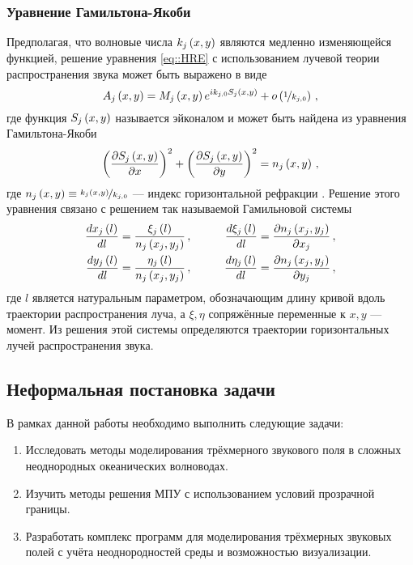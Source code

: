 \documentclass[../document.tex]{subfiles}
\begin{document}
        \subsubsection{Уравнение Гамильтона-Якоби}
            \par Предполагая, что волновые числа $k_j\left(x,y\right)$ являются медленно изменяющейся функцией, решение уравнения \eqref{eq::HRE} с использованием лучевой теории распространения звука может быть выражено в виде
            \begin{equation}
                A_j\left(x,y\right)=M_j\left(x,y\right)e^{ik_{j,0}S_j\left(x,y\right)}+o\left(\nicefrac{1}{k_{j,0}}\right)\,,
            \end{equation}
            где функция $S_j\left(x,y\right)$ называется эйконалом и может быть найдена из уравнения Гамильтона-Якоби
            \begin{equation}\label{eq::hamilton_jacoby}
                \left(\frac{\partial S_j\left(x,y\right)}{\partial x}\right)^2+\left(\frac{\partial S_j\left(x,y\right)}{\partial y}\right)^2=n_j\left(x,y\right)\,,
            \end{equation}
            где $n_j\left(x,y\right)\equiv \nicefrac{k_j\left(x,y\right)}{k_{j,0}}$ --- индекс горизонтальной рефракции \cite{burridge}. Решение этого уравнения связано с решением так называемой Гамильновой системы
            \begin{equation}\label{eq:hamilton_system}
                \begin{aligned}
                    \frac{dx_j\left(l\right)}{dl}&=\frac{\xi_j\left(l\right)}{n_j\left(x_j,y_j\right)}\,,\qquad&\frac{d\xi_j\left(l\right)}{dl}&=\frac{\partial n_j\left(x_j,y_j\right)}{\partial x_j}\,,\\
                    \frac{dy_j\left(l\right)}{dl}&=\frac{\eta_j\left(l\right)}{n_j\left(x_j,y_j\right)}\,,\qquad&\frac{d\eta_j\left(l\right)}{dl}&=\frac{\partial n_j\left(x_j,y_j\right)}{\partial y_j}\,,\\
                \end{aligned}
            \end{equation}
            где $l$ является натуральным параметром, обозначающим длину кривой вдоль траектории распространения луча, а $\xi,\eta$ сопряжённые переменные к $x,y$ --- момент. Из решения этой системы определяются траектории горизонтальных лучей распространения звука.
    \subsection{Неформальная постановка задачи}
        \par В рамках данной работы необходимо выполнить следующие задачи:
        \begin{enumerate}
            \item Исследовать методы моделирования трёхмерного звукового поля в сложных неоднородных океанических волноводах.
            \item Изучить методы решения МПУ с использованием условий прозрачной границы.
            \item Разработать комплекс программ для моделирования трёхмерных звуковых полей с учёта неоднородностей среды и возможностью визуализации.
        \end{enumerate}
\end{document}
